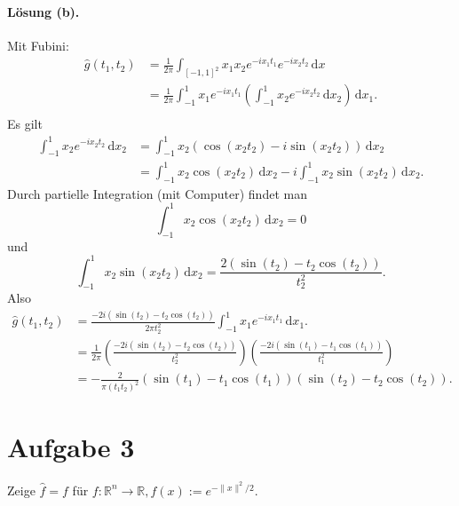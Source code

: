 \documentclass[10pt]{article}\usepackage[]{graphicx}\usepackage[]{color}
\newcommand{\R}{\mathbb{R}}
\newcommand{\df}{\,\textrm{d}}
\begin{document}
\begin{enumerate}[(a)]
  \paragraph{Lösung (b).}
Mit Fubini:
\begin{align*}
 \widehat{g}(t_1, t_2)
 &= \frac{1}{2\pi} \int_{[-1, 1]^2} x_1x_2 e^{-ix_1t_1}e^{-ix_2t_2} \df x \\
 &= \frac{1}{2\pi} \int_{-1}^1 x_1 e^{-ix_1t_1} \left(\int_{-1}^{1} x_2 e^{-ix_2t_2} \df x_2 \right) \df x_1. \\
\end{align*}
Es gilt
\begin{align*}
\int_{-1}^{1} x_2 e^{-ix_2t_2} \df x_2
&= \int_{-1}^1 x_2(\cos(x_2t_2) - i\sin(x_2t_2)) \df x_2 \\
&= \int_{-1}^1 x_2\cos(x_2t_2) \df x_2 - i\int_{-1}^1 x_2 \sin(x_2t_2) \df x_2.
\end{align*}
Durch partielle Integration (mit Computer) findet man
\[
 \int_{-1}^1 x_2\cos(x_2t_2) \df x_2 = 0
\]
und
\[
 \int_{-1}^1 x_2\sin(x_2t_2) \df x_2 = \frac{2(\sin(t_2)-t_2\cos(t_2))}{t_2^2}.
\]
Also
\begin{align*}
  \widehat{g}(t_1, t_2)
  &= \frac{-2i(\sin(t_2)-t_2\cos(t_2))}{2\pi t_2^2} \int_{-1}^1 x_1 e^{-ix_1t_1} \df x_1. \\
  &= \frac{1}{2\pi}\left(\frac{-2i(\sin(t_2)-t_2\cos(t_2))}{t_2^2}\right)\left(\frac{-2i(\sin(t_1)-t_1\cos(t_1))}{t_1^2}\right) \\
  &= -\frac{2}{\pi(t_1t_2)^2}(\sin(t_1) - t_1\cos(t_1))(\sin(t_2)-t_2\cos(t_2)).
\end{align*}

  
\end{enumerate}

\section*{Aufgabe 3}
Zeige $\widehat{f} = f$ für $f: \R^n \to \R, f(x) := e^{-\|x\|^2/2}$.
\end{document}
